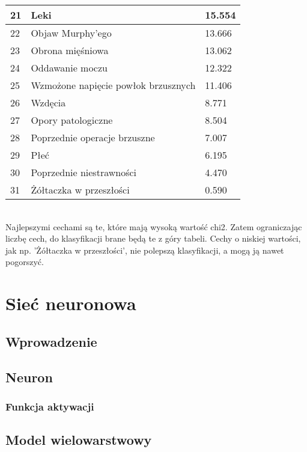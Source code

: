 \documentclass{report}
\begin{document}
\begin{tabular}{|l|l|l|}
        \hline 21 & Leki & 15.554 \\
        \hline 22 & Objaw Murphy'ego & 13.666 \\
        \hline 23 & Obrona mięśniowa & 13.062 \\
        \hline 24 & Oddawanie moczu & 12.322 \\
        \hline 25 & Wzmożone napięcie powłok brzusznych & 11.406 \\
        \hline 26 & Wzdęcia & 8.771 \\
        \hline 27 & Opory patologiczne & 8.504 \\
        \hline 28 & Poprzednie operacje brzuszne & 7.007 \\
        \hline 29 & Płeć & 6.195 \\
        \hline 30 & Poprzednie niestrawności & 4.470 \\
        \hline 31 & Żółtaczka w przeszłości & 0.590 \\
        \hline

    \end{tabular} \\

    Najlepszymi cechami są te, które mają wysoką wartość chi2.
    Zatem ograniczając liczbę cech, do klasyfikacji brane będą te z góry tabeli.
    Cechy o niskiej wartości, jak np. 'Żółtaczka w przeszłości', nie polepszą klasyfikacji, a mogą ją nawet pogorszyć.

    \chapter{Sieć neuronowa}

    \section{Wprowadzenie}

    \section{Neuron}

    \subsection{Funkcja aktywacji}

    \section{Model wielowarstwowy}
\end{document}
